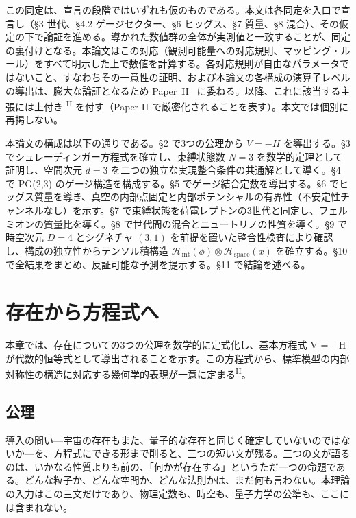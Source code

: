 \documentclass[fontsize=11pt,paper=a4,lualatex]{jlreq}
\newcommand{\PII}{\textsuperscript{\textup{II}}}
\begin{document}
この同定は、宣言の段階ではいずれも仮のものである。本文は各同定を入口で宣言し（§3 世代、§4.2 ゲージセクター、§6 ヒッグス、§7 質量、§8 混合）、その仮定の下で論証を進める。導かれた数値群の全体が実測値と一致することが、同定の裏付けとなる。本論文はこの対応（観測可能量への対応規則、マッピング・ルール）をすべて明示した上で数値を計算する。各対応規則が自由なパラメータではないこと、すなわちその一意性の証明、および本論文の各構成の演算子レベルの導出は、膨大な論証となるため Paper~II~\cite{paper2} に委ねる。以降、これに該当する主張には上付き \PII{} を付す（Paper II で厳密化されることを表す）。本文では個別に再掲しない。

本論文の構成は以下の通りである。§2 で3つの公理から $V = -H$
を導出する。§3 でシュレーディンガー方程式を確立し、束縛状態数 $N = 3$
を数学的定理として証明し、空間次元 $d = 3$
を二つの独立な実現整合条件の共通解として導く。§4 で PG(2,3)
のゲージ構造を構成する。§5 でゲージ結合定数を導出する。§6 でヒッグス質量を導き、真空の内部点固定と内部ポテンシャルの有界性（不安定性チャンネルなし）を示す。§7 で束縛状態を荷電レプトンの3世代と同定し、フェルミオンの質量比を導く。§8 で世代間の混合とニュートリノの性質を導く。§9 で時空次元 $D = 4$ とシグネチャ $(3,1)$ を前提を置いた整合性検査により確認し、構成の独立性からテンソル積構造 $\mathcal{H}_\mathrm{int}(\phi) \otimes \mathcal{H}_\mathrm{space}(x)$ を確立する。§10
で全結果をまとめ、反証可能な予測を提示する。§11 で結論を述べる。



\section{存在から方程式へ}\label{ux5b58ux5728ux304bux3089ux65b9ux7a0bux5f0fux3078}

本章では、存在についての3つの公理を数学的に定式化し、基本方程式 V = −H が代数的恒等式として導出されることを示す。この方程式から、標準模型の内部対称性の構造に対応する幾何学的表現が一意に定まる\PII{}。

\subsection{公理}\label{ux516cux7406}

導入の問い---宇宙の存在もまた、量子的な存在と同じく確定していないのではないか---を、方程式にできる形まで削ると、三つの短い文が残る。三つの文が語るのは、いかなる性質よりも前の、「何かが存在する」というただ一つの命題である。どんな粒子か、どんな空間か、どんな法則かは、まだ何も言わない。本理論の入力はこの三文だけであり、物理定数も、時空も、量子力学の公準も、ここには含まれない。
\end{document}
